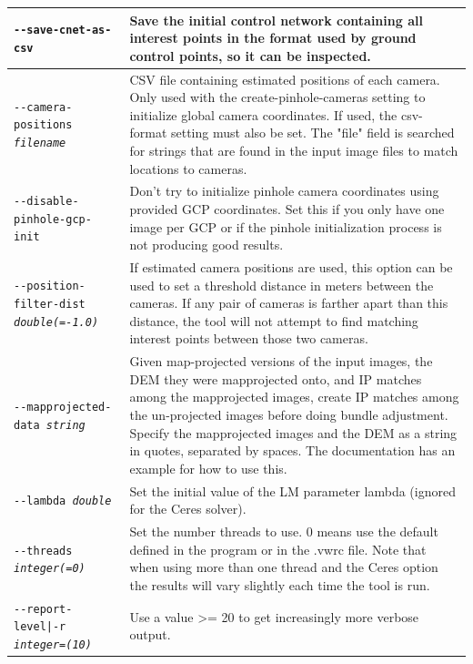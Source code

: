 \begin{longtable}{|p{8cm}|p{9cm}|}
\texttt{-\/-save-cnet-as-csv} & Save the initial control network containing all interest points in the format used by ground control points, so it can be inspected. \\ \hline

\texttt{-\/-camera-positions \textit{filename}} & CSV file containing estimated positions of each camera.
Only used with the create-pinhole-cameras setting to initialize global camera coordinates. If used,
the csv-format setting must also be set.  The "file" field is searched for strings that are found
in the input image files to match locations to cameras.\\ \hline

\texttt{-\/-disable-pinhole-gcp-init} & Don't try to initialize pinhole camera coordinates using
provided GCP coordinates.  Set this if you only have one image per GCP or if the pinhole
initialization process is not producing good results. \\ \hline

\texttt{-\/-position-filter-dist \textit{double(=-1.0)}} &
If estimated camera positions are used, this option can be used to set a threshold distance in meters
between the cameras.  If any pair of cameras is farther apart than this distance, the tool will not
attempt to find matching interest points between those two cameras.
\\ \hline

\texttt{-\/-mapprojected-data \textit{string}} &
Given map-projected versions of the input images, the DEM they were mapprojected onto, and IP matches among the mapprojected images, create IP matches among the un-projected images before doing bundle adjustment. Specify the mapprojected images and the DEM as a string in quotes, separated by spaces. The documentation has an example for how to use this.
\\ \hline

\texttt{-\/-lambda \textit{double}} & Set the initial value of the LM parameter
lambda (ignored for the Ceres solver).\\ \hline

\texttt{-\/-threads \textit{integer(=0)}} & Set the number threads to use. 0 means use the default defined in the program or in the .vwrc file. Note that when using more than one thread and the Ceres option the results will vary slightly each time the tool is run. \\ \hline

\texttt{-\/-report-level|-r \textit{integer=(10)}} & Use a value >= 20 to
get increasingly more verbose output. \\ \hline
\end{longtable}


